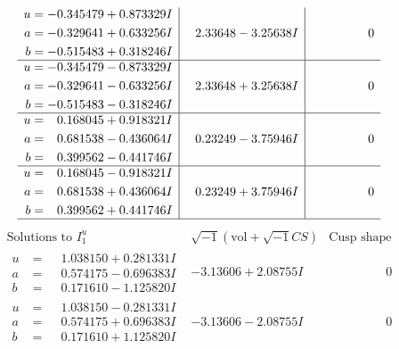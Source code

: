 \documentclass[1p]{elsarticle_modified}
\theoremstyle{definition}
\newcommand{\I}{\sqrt{-1}}
\begin{document}
$$\begin{array}{c|c|c}
\begin{aligned}
u &= -0.345479 + 0.873329 I \\
a &= -0.329641 + 0.633256 I \\
b &= -0.515483 + 0.318246 I\end{aligned}
 & \phantom{-}2.33648 - 3.25638 I & \phantom{-0.000000 } 0 \\ \hline\begin{aligned}
u &= -0.345479 - 0.873329 I \\
a &= -0.329641 - 0.633256 I \\
b &= -0.515483 - 0.318246 I\end{aligned}
 & \phantom{-}2.33648 + 3.25638 I & \phantom{-0.000000 } 0 \\ \hline\begin{aligned}
u &= \phantom{-}0.168045 + 0.918321 I \\
a &= \phantom{-}0.681538 - 0.436064 I \\
b &= \phantom{-}0.399562 - 0.441746 I\end{aligned}
 & \phantom{-}0.23249 - 3.75946 I & \phantom{-0.000000 } 0 \\ \hline\begin{aligned}
u &= \phantom{-}0.168045 - 0.918321 I \\
a &= \phantom{-}0.681538 + 0.436064 I \\
b &= \phantom{-}0.399562 + 0.441746 I\end{aligned}
 & \phantom{-}0.23249 + 3.75946 I & \phantom{-0.000000 } 0\\
 \hline 
 \end{array}$$\newpage$$\begin{array}{c|c|c}  
\text{Solutions to }I^u_{1}& \I (\text{vol} + \sqrt{-1}CS) & \text{Cusp shape}\\
 \hline 
\begin{aligned}
u &= \phantom{-}1.038150 + 0.281331 I \\
a &= \phantom{-}0.574175 - 0.696383 I \\
b &= \phantom{-}0.171610 - 1.125820 I\end{aligned}
 & -3.13606 + 2.08755 I & \phantom{-0.000000 } 0 \\ \hline\begin{aligned}
u &= \phantom{-}1.038150 - 0.281331 I \\
a &= \phantom{-}0.574175 + 0.696383 I \\
b &= \phantom{-}0.171610 + 1.125820 I\end{aligned}
 & -3.13606 - 2.08755 I & \phantom{-0.000000 } 0 \\ \hline\begin{aligned}

\end{aligned}
\end{array}$$
\end{document}
